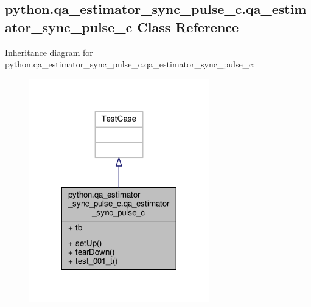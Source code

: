 \subsection{python.\+qa\+\_\+estimator\+\_\+sync\+\_\+pulse\+\_\+c.\+qa\+\_\+estimator\+\_\+sync\+\_\+pulse\+\_\+c Class Reference}
\label{classpython_1_1qa__estimator__sync__pulse__c_1_1qa__estimator__sync__pulse__c}


Inheritance diagram for python.\+qa\+\_\+estimator\+\_\+sync\+\_\+pulse\+\_\+c.\+qa\+\_\+estimator\+\_\+sync\+\_\+pulse\+\_\+c\+:
\nopagebreak
\begin{figure}[H]
\begin{center}
\leavevmode
\includegraphics[width=221pt]{d1/d23/classpython_1_1qa__estimator__sync__pulse__c_1_1qa__estimator__sync__pulse__c__inherit__graph}
\end{center}
\end{figure}


